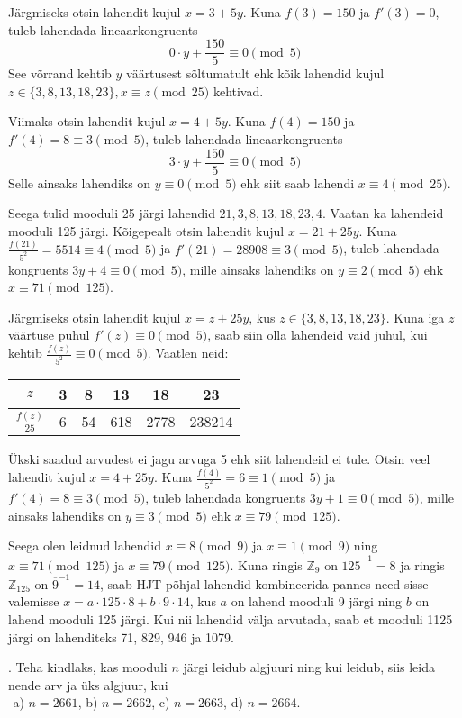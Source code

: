 \documentclass[a4paper, 10pt]{article}
\newcommand{\Z}{\mathbb{Z}}
\newcommand{\w}{\overline}
\begin{document}
Järgmiseks otsin lahendit kujul $x=3+5y$. Kuna $f(3)=150$ ja $f'(3)=0$, tuleb lahendada lineaarkongruents $$0\cdot y+\frac{150}{5}\equiv0\pmod5$$ See võrrand kehtib $y$ väärtusest sõltumatult ehk kõik lahendid kujul $z\in\{3,8,13,18,23\}, x\equiv z\pmod{25}$ kehtivad.

Viimaks otsin lahendit kujul $x=4+5y$. Kuna $f(4)=150$ ja $f'(4)=8\equiv3\pmod5$, tuleb lahendada lineaarkongruents $$3\cdot y+\frac{150}{5}\equiv0\pmod5$$ Selle ainsaks lahendiks on $y\equiv0\pmod5$ ehk siit saab lahendi $x\equiv4\pmod{25}$.

Seega tulid mooduli 25 järgi lahendid $21,3,8,13,18,23,4$. Vaatan ka lahendeid mooduli 125 järgi. Kõigepealt otsin lahendit kujul $x=21+25y$. Kuna $\frac{f(21)}{5^2}=5514\equiv4\pmod5$ ja $f'(21)=28908\equiv3\pmod5$, tuleb lahendada kongruents $3y+4\equiv0\pmod5$, mille ainsaks lahendiks on $y\equiv2\pmod5$ ehk $x\equiv71\pmod{125}$.

Järgmiseks otsin lahendit kujul $x=z+25y$, kus $z\in\{3,8,13,18,23\}$. Kuna iga $z$ väärtuse puhul $f'(z)\equiv 0\pmod5$, saab siin olla lahendeid vaid juhul, kui kehtib $\frac{f(z)}{5^2}\equiv0\pmod5$. Vaatlen neid:

\begin{tabular}{c|c|c|c|c|c}
$z$&3&8&13&18&23\\
\hline
$\frac{f(z)}{25}$&6&54&618&2778&238214\\
\end{tabular}

Ükski saadud arvudest ei jagu arvuga 5 ehk siit lahendeid ei tule. Otsin veel lahendit kujul $x=4+25y$. Kuna $\frac{f(4)}{5^2}=6\equiv1\pmod5$ ja $f'(4)=8\equiv3\pmod5$, tuleb lahendada kongruents $3y+1\equiv0\pmod5$, mille ainsaks lahendiks on $y\equiv3\pmod5$ ehk $x\equiv79\pmod{125}$.

Seega olen leidnud lahendid $x\equiv8\pmod9$ ja $x\equiv1\pmod9$ ning $x\equiv71\pmod{125}$ ja $x\equiv79\pmod{125}$. Kuna ringis $\Z_9$ on $\w{125}^{-1}=\w8$ ja ringis $\Z_{125}$ on $\w9^{-1}=14$, saab HJT põhjal lahendid kombineerida pannes need sisse valemisse $x=a\cdot125\cdot8+b\cdot9\cdot14$, kus $a$ on lahend mooduli 9 järgi ning $b$ on lahend mooduli 125 järgi. Kui nii lahendid välja arvutada, saab et mooduli 1125 järgi on lahenditeks 71, 829, 946 ja 1079.
\bigskip

. Teha kindlaks, kas mooduli $n$ j\"argi leidub algjuuri ning 
kui leidub, siis leida nende arv ja \"uks algjuur, kui \\
{${}_{}$}\hskip1.5cm
 a) $n=2661$, \hskip0.5cm b) $n=2662$, \hskip0.5cm c) $n=2663$, \hskip0.5cm d) $n=2664$.
 
\end{document}
